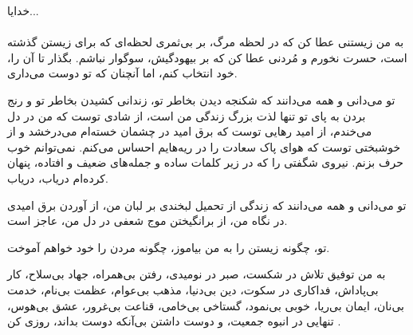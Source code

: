 \clearpage\newpage
 
{\nastaliq \LARGE
خدایا...%
}\\
\vspace{.5cm}\\
به من زیستنی عطا کن که در لحظه مرگ، بر بی‌ثمری لحظه‌ای که برای زیستن گذشته است، حسرت نخورم   و مُردنی عطا کن که بر بیهودگیش، سوگوار نباشم. بگذار تا آن را، خود انتخاب کنم، اما آنچنان که تو دوست می‌داری.

تو می‌دانی و همه می‌دانند که شکنجه دیدن بخاطر تو، زندانی کشیدن بخاطر تو و رنج بردن به پای تو تنها لذت بزرگ زندگی من است، از شادی توست که من در دل می‌خندم، از امید رهایی توست که برق امید در چشمان خسته‌ام می‌درخشد و از خوشبختی توست که هوای پاک سعادت را در ریه‌هایم احساس می‌کنم. نمی‌توانم خوب حرف بزنم. نیروی شگفتی را که در زیر کلمات ساده و جمله‌های ضعیف و افتاده، پنهان کرده‌ام دریاب، دریاب.

تو می‌دانی و همه می‌دانند که زندگی از تحمیل لبخندی بر لبان من، از آوردن برق امیدی در نگاه من، از برانگیختن موج شعفی در دل من، عاجز است.

تو، چگونه زیستن را به من بیاموز، چگونه مردن را خود خواهم آموخت.

به من توفیق تلاش در شکست، صبر در نومیدی، رفتن بی‌همراه، جهاد بی‌سلاح، کار بی‌پاداش، فداکاری در سکوت، دین بی‌دنیا، مذهب بی‌عوام، عظمت بی‌نام، خدمت بی‌نان، ایمان بی‌ریا، خوبی بی‌نمود، گستاخی بی‌خامی، قناعت بی‌غرور، عشق بی‌هوس، تنهایی در انبوه جمعیت، و دوست داشتن بی‌آنکه دوست بداند،  روزی کن
.

\clearpage